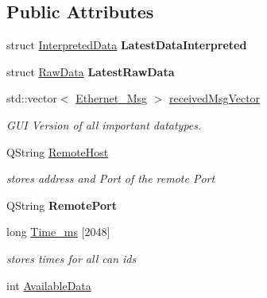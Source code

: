 \subsection*{Public Attributes}
\begin{DoxyCompactItemize}
\item 
\hypertarget{class_main_window_afe4219192937884940db58eb7ce0ad75}{}struct \hyperlink{struct_interpreted_data}{Interpreted\+Data} {\bfseries Latest\+Data\+Interpreted}\label{class_main_window_afe4219192937884940db58eb7ce0ad75}

\item 
\hypertarget{class_main_window_ad77854e87f24e8861f5d34cf8f10356f}{}struct \hyperlink{struct_raw_data}{Raw\+Data} {\bfseries Latest\+Raw\+Data}\label{class_main_window_ad77854e87f24e8861f5d34cf8f10356f}

\item 
\hypertarget{class_main_window_a8c5ee25defecabfbbfe1c6e4d4833ca7}{}std\+::vector$<$ \hyperlink{struct_ethernet___msg}{Ethernet\+\_\+\+Msg} $>$ \hyperlink{class_main_window_a8c5ee25defecabfbbfe1c6e4d4833ca7}{received\+Msg\+Vector}\label{class_main_window_a8c5ee25defecabfbbfe1c6e4d4833ca7}

\begin{DoxyCompactList}\small\item\em G\+U\+I Version of all important datatypes. \end{DoxyCompactList}\item 
\hypertarget{class_main_window_a10c78fce9727f061100acc3d022ce823}{}Q\+String \hyperlink{class_main_window_a10c78fce9727f061100acc3d022ce823}{Remote\+Host}\label{class_main_window_a10c78fce9727f061100acc3d022ce823}

\begin{DoxyCompactList}\small\item\em stores address and Port of the remote Port \end{DoxyCompactList}\item 
\hypertarget{class_main_window_afab8dc609814a39254f4289b0ebff63f}{}Q\+String {\bfseries Remote\+Port}\label{class_main_window_afab8dc609814a39254f4289b0ebff63f}

\item 
\hypertarget{class_main_window_aa0e0038311a1134ad3146c2036da695f}{}long \hyperlink{class_main_window_aa0e0038311a1134ad3146c2036da695f}{Time\+\_\+ms} \mbox{[}2048\mbox{]}\label{class_main_window_aa0e0038311a1134ad3146c2036da695f}

\begin{DoxyCompactList}\small\item\em stores times for all can ids \end{DoxyCompactList}\item 
\hypertarget{class_main_window_a8613097a27bf3adea95fb51410be3055}{}int \hyperlink{class_main_window_a8613097a27bf3adea95fb51410be3055}{Available\+Data}\label{class_main_window_a8613097a27bf3adea95fb51410be3055}


\end{DoxyCompactItemize}
